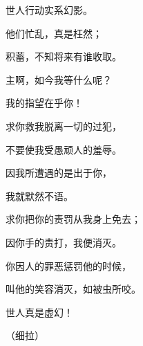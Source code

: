 {\Q {}世人行动实系幻影。
\par }{\Q 他们忙乱，真是枉然；
\par }{\Q 积蓄{}，不知将来有谁收取。
\par }{\BB \par }{\Q {}主啊，如今我等什么呢？
\par }{\Q 我的指望在乎你！
\par }{\Q {}求你救我脱离一切的过犯，
\par }{\Q 不要使我受愚顽人的羞辱。
\par }{\Q {}因我所遭遇的是出于你，
\par }{\Q 我就默然不语。
\par }{\Q {}求你把你的责罚从我身上免去；
\par }{\Q 因你手的责打，我便消灭。
\par }{\Q {}你因人的罪恶惩罚他的时候，
\par }{\Q 叫他的笑容消灭，如{}被虫所咬。
\par }{\Q 世人真是虚幻！
\par }{\QS （细拉）
\par }
